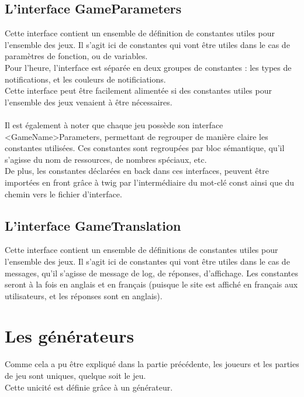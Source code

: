 \documentclass{article}
\begin{document}
        \subsection{L'interface GameParameters}

            Cette interface contient un ensemble de définition de constantes utiles pour l'ensemble des jeux. Il s'agit ici de constantes qui vont être utiles dans le cas de paramètres de fonction, ou de variables.\\
            \indent Pour l'heure, l'interface est séparée en deux groupes de constantes : les types de notifications, et les couleurs de notificiations. \\
            \indent Cette interface peut être facilement alimentée si des constantes utiles pour l'ensemble des jeux venaient à être nécessaires.\\
            \\
            \indent Il est également à noter que chaque jeu possède son interface <GameName>Parameters, permettant de regrouper de manière claire les constantes utilisées. Ces constantes sont regroupées par bloc sémantique, qu'il s'agisse du nom de ressources, de nombres spéciaux, etc. \\
            \indent De plus, les constantes déclarées en back dans ces interfaces, peuvent être importées en front grâce à twig par l'intermédiaire du mot-clé const ainsi que du chemin vers le fichier d'interface.

        \subsection{L'interface GameTranslation}

            Cette interface contient un ensemble de définitions de constantes utiles pour l'ensemble des jeux. Il s'agit ici de constantes qui vont être utiles dans le cas de messages, qu'il s'agisse de message de log, de réponses, d'affichage. Les constantes seront à la fois en anglais et en français (puisque le site est affiché en français aux utilisateurs, et les réponses sont en anglais).

    \section{Les générateurs}

        Comme cela a pu être expliqué dans la partie précédente, les joueurs et les parties de jeu sont uniques, quelque soit le jeu.\\
        \indent Cette unicité est définie grâce à un générateur.
\end{document}

